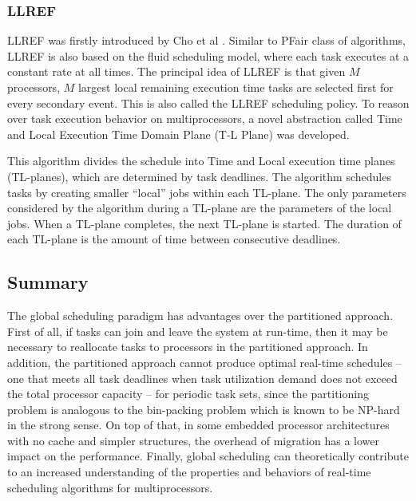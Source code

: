 \documentclass[preprint,12pt]{elsarticle}
\begin{document}
\subsubsection{LLREF}
LLREF was firstly introduced by Cho et al \cite{cho2006optimal}. Similar to
PFair class of algorithms, LLREF is also based on the fluid scheduling model,
where each task executes at a constant rate at all times.
The principal idea of LLREF is that given $M$ processors,  $M$ largest local
remaining execution time tasks are selected first for every secondary event. 
This is also called the LLREF scheduling policy.
To reason over task execution behavior on multiprocessors, a novel abstraction
 called Time and Local Execution Time Domain Plane (T-L Plane) was developed.

 This algorithm divides the schedule into Time and Local execution time planes
 (TL-planes), which are determined by task deadlines. The algorithm schedules
 tasks by creating smaller “local” jobs within each TL-plane. The only
 parameters considered by the algorithm during a TL-plane are the parameters
 of the local jobs. When a TL-plane completes, the next TL-plane is started.
 The duration of each TL-plane is the amount of time between consecutive
 deadlines.

\subsection{Summary}
The global scheduling paradigm has advantages over the partitioned approach. 
First of all, if tasks can join and leave the system at run-time, then it may be
necessary to reallocate tasks to processors in the partitioned approach.
In addition, the partitioned approach cannot produce optimal
real-time schedules -- one that meets all task deadlines
when task utilization demand does not exceed the total processor
capacity -- for periodic task sets, since the partitioning
problem is analogous to the bin-packing problem which is known to be NP-hard
in the strong sense. 
On top of that, in some embedded processor architectures with no cache and
simpler structures, the overhead of migration has a lower
impact on the performance. 
Finally, global scheduling can theoretically contribute to an increased
understanding of the properties and behaviors of real-time scheduling
algorithms for multiprocessors.
\end{document}
